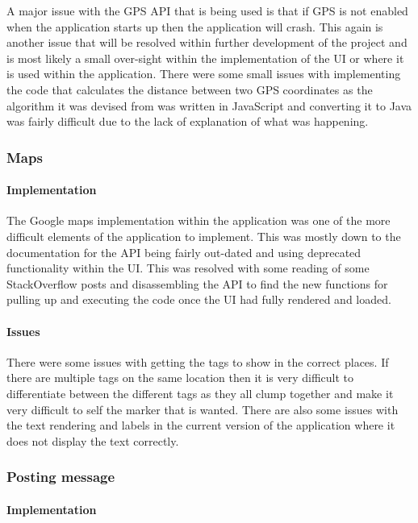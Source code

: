 A major issue with the GPS API that is being used is that if GPS is not enabled when the application starts up then the application will crash. This again is another issue that will be resolved within further development of the project and is most likely a small over-sight within the implementation of the UI or where it is used within the application. There were some small issues with implementing the code that calculates the distance between two GPS coordinates as the algorithm it was devised from was written in JavaScript and converting it to Java was fairly difficult due to the lack of explanation of what was happening.


\subsubsection{Maps}

\paragraph*{Implementation}

The Google maps implementation within the application was one of the more difficult elements of the application to implement. This was mostly down to the documentation for the API being fairly out-dated and using deprecated functionality within the UI. This was resolved with some reading of some StackOverflow posts and disassembling the API to find the new functions for pulling up and executing the code once the UI had fully rendered and loaded. 

\paragraph*{Issues}

There were some issues with getting the tags to show in the correct places. If there are multiple tags on the same location then it is very difficult to differentiate between the different tags as they all clump together and make it very difficult to self the marker that is wanted. There are also some issues with the text rendering and labels in the current version of the application where it does not display the text correctly.

\subsubsection{Posting message}

\paragraph*{Implementation}

